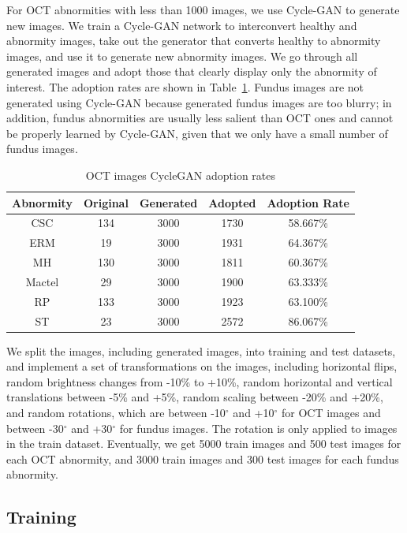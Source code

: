 \documentclass{article}
\begin{document}
	For OCT abnormities with less than 1000 images, we use Cycle-GAN \autocite{Zhu_Park_Isola_Efros_2020} to generate new images. We train a Cycle-GAN network to interconvert healthy and abnormity images, take out the generator that converts healthy to abnormity images, and use it to generate new abnormity images. We go through all generated images and adopt those that clearly display only the abnormity of interest. The adoption rates are shown in Table~\ref{tb:cycleGAN_number}. Fundus images are not generated using Cycle-GAN because generated fundus images are too blurry; in addition, fundus abnormities are usually less salient than OCT ones and cannot be properly learned by Cycle-GAN, given that we only have a small number of fundus images.
	
	{
		\fontsize{9}{12}\selectfont
		{
			\begin{longtable}{ccccc}
				\caption{OCT images CycleGAN adoption rates}
				\label{tb:cycleGAN_number}\\
				\toprule
				Abnormity&Original&Generated&Adopted&Adoption Rate\\
				\midrule
				CSC   &134&3000&1730&58.667\% \\
				ERM   &19 &3000&1931&64.367\% \\
				MH    &130&3000&1811&60.367\% \\
				Mactel&29 &3000&1900&63.333\% \\
				RP    &133&3000&1923&63.100\% \\
				ST    &23 &3000&2572&86.067\% \\
				\bottomrule
			\end{longtable}
		}
	}
	
	We split the images, including generated images, into training and test datasets, and implement a set of transformations on the images, including horizontal flips, random brightness changes from -10\% to +10\%, random horizontal and vertical translations between -5\% and +5\%, random scaling between -20\% and +20\%, and random rotations, which are between -10$^\circ$ and +10$^\circ$ for OCT images and between -30$^\circ$ and +30$^\circ$ for fundus images. The rotation is only applied to images in the train dataset. Eventually, we get 5000 train images and 500 test images for each OCT abnormity, and 3000 train images and 300 test images for each fundus abnormity.
	
	\subsection{Training}
	
\end{document}
